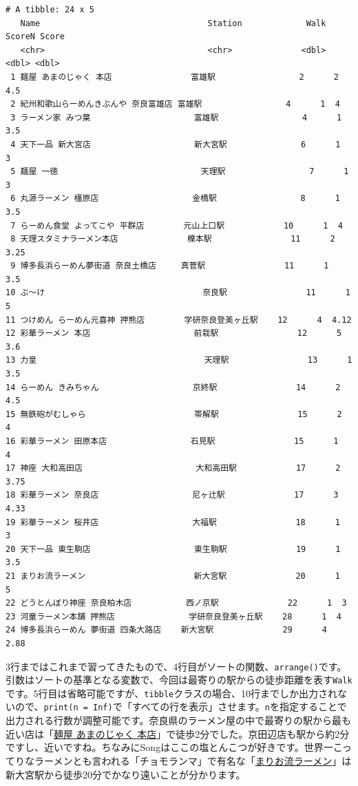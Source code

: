 \documentclass[
  a4paper,
  pandoc,
  ja=standard,
  jafont=haranoaji]{bxjsbook}
\begin{document}
\begin{verbatim}
# A tibble: 24 x 5
   Name                                  Station             Walk ScoreN Score
   <chr>                                 <chr>              <dbl>  <dbl> <dbl>
 1 麺屋 あまのじゃく 本店                富雄駅                 2      2  4.5 
 2 紀州和歌山らーめんきぶんや 奈良富雄店 富雄駅                 4      1  4   
 3 ラーメン家 みつ葉                     富雄駅                 4      1  3.5 
 4 天下一品 新大宮店                     新大宮駅               6      1  3   
 5 麺屋 一徳                             天理駅                 7      1  3   
 6 丸源ラーメン 橿原店                   金橋駅                 8      1  3.5 
 7 らーめん食堂 よってこや 平群店        元山上口駅            10      1  4   
 8 天理スタミナラーメン本店              櫟本駅                11      2  3.25
 9 博多長浜らーめん夢街道 奈良土橋店     真菅駅                11      1  3.5 
10 ぶ～け                                奈良駅                11      1  5   
11 つけめん らーめん元喜神 押熊店        学研奈良登美ヶ丘駅    12      4  4.12
12 彩華ラーメン 本店                     前栽駅                12      5  3.6 
13 力皇                                  天理駅                13      1  3.5 
14 らーめん きみちゃん                   京終駅                14      2  4.5 
15 無鉄砲がむしゃら                      帯解駅                15      2  4   
16 彩華ラーメン 田原本店                 石見駅                15      1  4   
17 神座 大和高田店                       大和高田駅            17      2  3.75
18 彩華ラーメン 奈良店                   尼ヶ辻駅              17      3  4.33
19 彩華ラーメン 桜井店                   大福駅                18      1  3   
20 天下一品 東生駒店                     東生駒駅              19      1  3.5 
21 まりお流ラーメン                      新大宮駅              20      1  5   
22 どうとんぼり神座 奈良柏木店           西ノ京駅              22      1  3   
23 河童ラーメン本舗 押熊店               学研奈良登美ヶ丘駅    28      1  4   
24 博多長浜らーめん 夢街道 四条大路店    新大宮駅              29      4  2.88
\end{verbatim}

3行まではこれまで習ってきたもので、4行目がソートの関数、\texttt{arrange()}です。引数はソートの基準となる変数で、今回は最寄りの駅からの徒歩距離を表す\texttt{Walk}です。5行目は省略可能ですが、\texttt{tibble}クラスの場合、10行までしか出力されないので、\texttt{print(n\ =\ Inf)}で「すべての行を表示」させます。\texttt{n}を指定することで出力される行数が調整可能です。奈良県のラーメン屋の中で最寄りの駅から最も近い店は「\href{https://www.menya-amanojaku.com}{麺屋
あまのじゃく
本店}」で徒歩2分でした。京田辺店も駅から約2分ですし、近いですね。ちなみにSongはここの塩とんこつが好きです。世界一こってりなラーメンとも言われる「チョモランマ」で有名な「\href{http://www.marioramen.com}{まりお流ラーメン}」は新大宮駅から徒歩20分でかなり遠いことが分かります。
\end{document}
